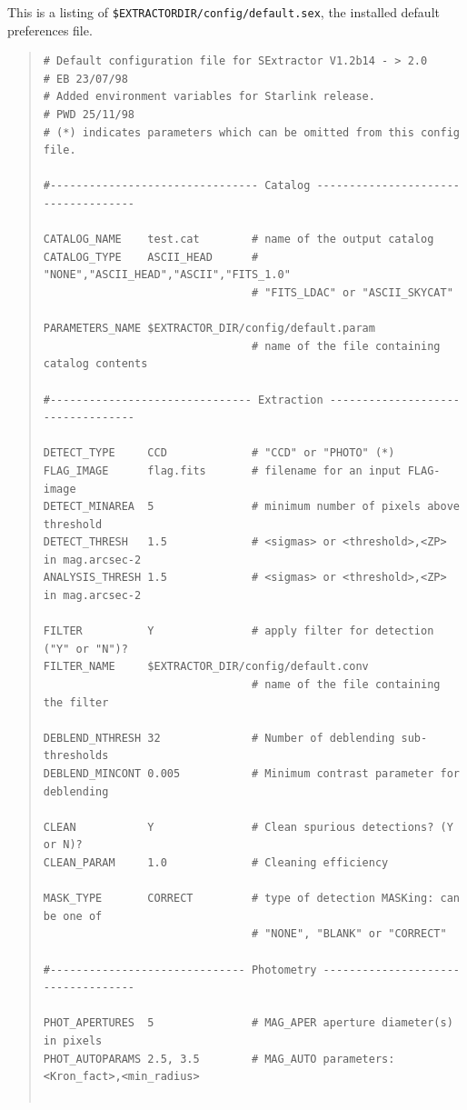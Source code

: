 \documentclass[twoside,11pt]{article}
\renewcommand{\_}{\texttt{\symbol{95}}}
\begin{document}
This is a listing of \texttt{\$EXTRACTOR\_DIR/config/default.sex}, the
installed default preferences file.
\small
\begin{quote} \begin{verbatim}
# Default configuration file for SExtractor V1.2b14 - > 2.0
# EB 23/07/98
# Added environment variables for Starlink release.
# PWD 25/11/98
# (*) indicates parameters which can be omitted from this config file.

#-------------------------------- Catalog ------------------------------------

CATALOG_NAME    test.cat        # name of the output catalog
CATALOG_TYPE    ASCII_HEAD      # "NONE","ASCII_HEAD","ASCII","FITS_1.0"
                                # "FITS_LDAC" or "ASCII_SKYCAT"

PARAMETERS_NAME $EXTRACTOR_DIR/config/default.param
                                # name of the file containing catalog contents

#------------------------------- Extraction ----------------------------------

DETECT_TYPE     CCD             # "CCD" or "PHOTO" (*)
FLAG_IMAGE      flag.fits       # filename for an input FLAG-image
DETECT_MINAREA  5               # minimum number of pixels above threshold
DETECT_THRESH   1.5             # <sigmas> or <threshold>,<ZP> in mag.arcsec-2
ANALYSIS_THRESH 1.5             # <sigmas> or <threshold>,<ZP> in mag.arcsec-2

FILTER          Y               # apply filter for detection ("Y" or "N")?
FILTER_NAME     $EXTRACTOR_DIR/config/default.conv
                                # name of the file containing the filter

DEBLEND_NTHRESH 32              # Number of deblending sub-thresholds
DEBLEND_MINCONT 0.005           # Minimum contrast parameter for deblending

CLEAN           Y               # Clean spurious detections? (Y or N)?
CLEAN_PARAM     1.0             # Cleaning efficiency

MASK_TYPE       CORRECT         # type of detection MASKing: can be one of
                                # "NONE", "BLANK" or "CORRECT"

#------------------------------ Photometry -----------------------------------

PHOT_APERTURES  5               # MAG_APER aperture diameter(s) in pixels
PHOT_AUTOPARAMS 2.5, 3.5        # MAG_AUTO parameters: <Kron_fact>,<min_radius>


\end{verbatim}
\end{quote}
\end{document}
